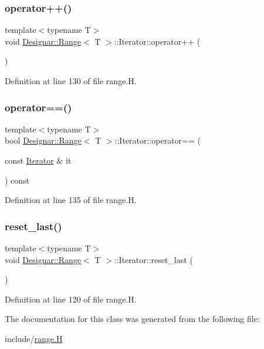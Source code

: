 \subsubsection{\texorpdfstring{operator++()}{operator++()}}
{\footnotesize\ttfamily template$<$typename T$>$ \\
void \hyperlink{class_designar_1_1_range}{Designar\+::\+Range}$<$ T $>$\+::Iterator\+::operator++ (\begin{DoxyParamCaption}{ }\end{DoxyParamCaption})\hspace{0.3cm}{\ttfamily [inline]}}



Definition at line 130 of file range.\+H.

\mbox{\label{class_designar_1_1_range_1_1_iterator_a0c3ce6ecdc451e8f8f91d114485abb2b}} 
\subsubsection{\texorpdfstring{operator==()}{operator==()}}
{\footnotesize\ttfamily template$<$typename T$>$ \\
bool \hyperlink{class_designar_1_1_range}{Designar\+::\+Range}$<$ T $>$\+::Iterator\+::operator== (\begin{DoxyParamCaption}\item[{const \hyperlink{class_designar_1_1_range_1_1_iterator}{Iterator} \&}]{it }\end{DoxyParamCaption}) const\hspace{0.3cm}{\ttfamily [inline]}}



Definition at line 135 of file range.\+H.

\mbox{\label{class_designar_1_1_range_1_1_iterator_ae5a8045527f0582b9a0f126ccf50ae19}} 
\subsubsection{\texorpdfstring{reset\+\_\+last()}{reset\_last()}}
{\footnotesize\ttfamily template$<$typename T$>$ \\
void \hyperlink{class_designar_1_1_range}{Designar\+::\+Range}$<$ T $>$\+::Iterator\+::reset\+\_\+last (\begin{DoxyParamCaption}{ }\end{DoxyParamCaption})\hspace{0.3cm}{\ttfamily [inline]}}



Definition at line 120 of file range.\+H.



The documentation for this class was generated from the following file\+:\begin{DoxyCompactItemize}
\item 
include/\hyperlink{range_8_h}{range.\+H}\end{DoxyCompactItemize}
